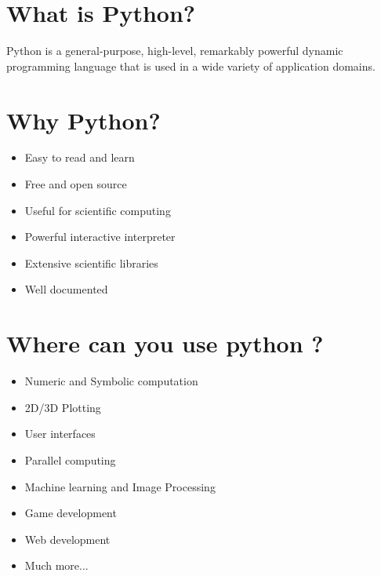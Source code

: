 \documentclass[final]{beamer}
\begin{document}
\begin{frame}[t]
\begin{multicols}{2}

\section{What is Python?}

Python is a general-purpose, high-level, remarkably powerful dynamic
programming language that is used in a wide variety of application
domains.


\section{Why Python?}
\begin{itemize}
\item {Easy to read and learn}
\item {Free and open source}
\item {Useful for scientific computing}
\item {Powerful interactive interpreter}
\item {Extensive scientific libraries}
\item {Well documented}
\end{itemize}


\section{Where can you use python ?}
\begin{itemize}
\item {Numeric and Symbolic computation}
\item {2D/3D Plotting}
\item {User interfaces}
\item {Parallel computing}
\item {Machine learning and Image Processing}
\item {Game development}
\item {Web development}
\item {Much more...}  
\end{itemize}


\end{multicols}
\end{frame}
\end{document}
